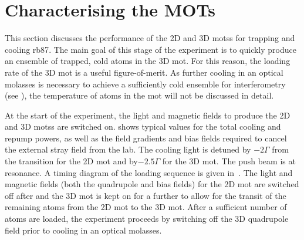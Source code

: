\section{Characterising the MOTs}\label{sec:mot_characterisation}
This section discusses the performance of the 2D and 3D \acp{mots} for trapping
and cooling \ac{rb87}. The main goal of this stage of the experiment is to
quickly produce an ensemble of trapped, cold atoms in the 3D \ac{mot}. For this
reason, the loading rate of the 3D \ac{mot} is a useful figure-of-merit. As
further cooling in an optical molasses is necessary to achieve a sufficiently
cold ensemble for interferometry (see ), the
temperature of atoms in the \ac{mot} will not be discussed in detail.
\par\noindent \nocite{Haw2012}
At the start of the experiment, the light and magnetic fields to produce the 2D
and 3D \acp{mots} are switched on.  shows
typical values for the total cooling and repump powers, as well as the field gradients
and bias fields required to cancel the external stray field from the
lab. The cooling light is detuned by \(-2 \Gamma\) from the
 transition for the 2D \ac{mot} and by\(-2.5 \Gamma\) for the 3D
\ac{mot}. The push beam is at resonance. A timing diagram of the
loading sequence is given in~. The
light and magnetic fields (both the quadrupole and bias fields)
for the 2D \ac{mot} are switched off after  and the
3D \ac{mot} is kept on for a further  to allow for
the transit of the remaining atoms from the 2D \ac{mot} to the 3D \ac{mot}.
After a sufficient number of atoms are loaded, the experiment proceeds by
switching off the 3D quadrupole field prior to cooling in an optical molasses.
